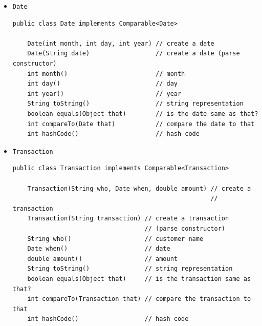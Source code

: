 \documentclass[8pt,a4paper,compress]{beamer}
\begin{document}
\begin{frame}[fragile]
\begin{itemize}
\item \lstinline{Date}
\begin{lstlisting}[language={},mathescape]
public class Date implements Comparable<Date>

    Date(int month, int day, int year) // create a date
    Date(String date)                  // create a date (parse constructor)
    int month()                        // month
    int day()                          // day
    int year()                         // year
    String toString()                  // string representation
    boolean equals(Object that)        // is the date same as that?
    int compareTo(Date that)           // compare the date to that
    int hashCode()                     // hash code
\end{lstlisting}

\item \lstinline{Transaction}
\begin{lstlisting}[language={},mathescape]
public class Transaction implements Comparable<Transaction>

    Transaction(String who, Date when, double amount) // create a 
                                                      // transaction
    Transaction(String transaction) // create a transaction 
                                    // (parse constructor)
    String who()                    // customer name
    Date when()                     // date
    double amount()                 // amount
    String toString()               // string representation
    boolean equals(Object that)     // is the transaction same as that?
    int compareTo(Transaction that) // compare the transaction to that
    int hashCode()                  // hash code
\end{lstlisting}
\end{itemize}
\end{frame}
\end{document}
